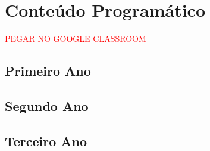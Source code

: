 \chapter{Conteúdo Programático} %
\label{chap:Conteúdo Programático}
\textcolor{red}{PEGAR NO GOOGLE CLASSROOM}

\section{Primeiro Ano} %
\label{sec:Primeiro Ano}

\section{Segundo Ano} %
\label{sec:Segundo Ano}

\section{Terceiro Ano} %
\label{sec:Terceiro Ano}

